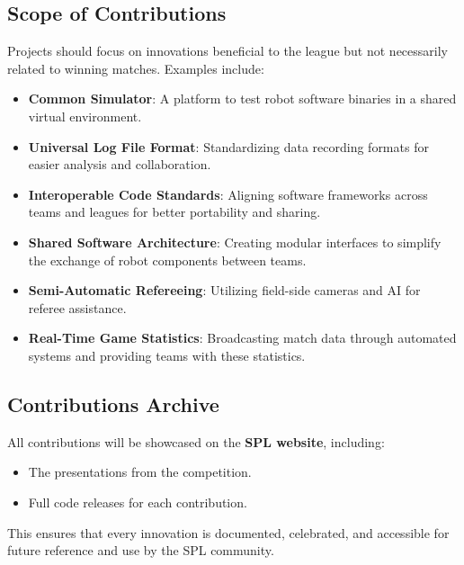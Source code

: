 \subsection{Scope of Contributions}
Projects should focus on innovations beneficial to the league but not necessarily related to winning matches. Examples include:
\begin{itemize}
    \item \textbf{Common Simulator}: A platform to test robot software binaries in a shared virtual environment.
    \item \textbf{Universal Log File Format}: Standardizing data recording formats for easier analysis and collaboration.
    \item \textbf{Interoperable Code Standards}: Aligning software frameworks across teams and leagues for better portability and sharing.
    \item \textbf{Shared Software Architecture}: Creating modular interfaces to simplify the exchange of robot components between teams.
    \item \textbf{Semi-Automatic Refereeing}: Utilizing field-side cameras and AI for referee assistance.
    \item \textbf{Real-Time Game Statistics}: Broadcasting match data through automated systems and providing teams with these statistics.
\end{itemize}

\subsection{Contributions Archive}
All contributions will be showcased on the \textbf{SPL website}, including:
\begin{itemize}
    \item The presentations from the competition.
    \item Full code releases for each contribution.
\end{itemize}
This ensures that every innovation is documented, celebrated, and accessible for future reference and use by the SPL community.
